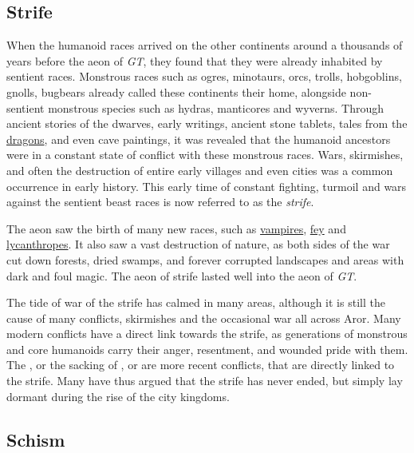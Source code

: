\subsection{Strife}
\label{sec:Strife}

When the humanoid races arrived on the other continents around a thousands of
years before the aeon of \emph{GT}, they found that they were already
inhabited by sentient races. Monstrous races such as ogres, minotaurs, orcs,
trolls, hobgoblins, gnolls, bugbears already called these continents their
home, alongside non-sentient monstrous species such as hydras, manticores and
wyverns. Through ancient stories of the dwarves, early writings, ancient stone
tablets, tales from the \hyperref[sec:Dragons]{dragons}, and even cave
paintings, it was revealed that the humanoid ancestors were in a constant
state of conflict with these monstrous races. Wars, skirmishes, and often the
destruction of entire early villages and even cities was a common occurrence
in early history. This early time of constant fighting, turmoil and wars
against the sentient beast races is now referred to as the \emph{strife}.

The aeon saw the birth of many new races, such as
\hyperref[sec:Vampires]{vampires}, \hyperref[sec:Fey]{fey} and
\hyperref[sec:Lycanthropes]{lycanthropes}. It also saw a vast destruction of
nature, as both sides of the war cut down forests, dried swamps, and forever
corrupted landscapes and areas with dark and foul magic. The aeon of strife
lasted well into the aeon of \emph{GT}.

The tide of war of the strife has calmed in many areas, although it is still
the cause of many conflicts, skirmishes and the occasional war all across
Aror.  Many modern conflicts have a direct link towards the strife, as
generations of monstrous and core humanoids carry their anger, resentment, and
wounded pride with them. The , or the sacking of
, or  are more recent conflicts,
that are directly linked to the strife. Many have thus argued that the strife
has never ended, but simply lay dormant during the rise of the city kingdoms.

\subsection{Schism}
\label{sec:Schism}

